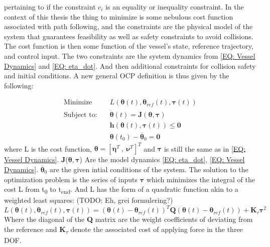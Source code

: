 pertaining to if the constraint $c_i$ is an equality or inequality constraint. In the context of this thesis the thing to minimize is some nebulous cost function
associated with path following, and the constraints are the physical model of the system that guarantees feasibility as well as safety constraints to avoid collisions.
The cost function is then some function of the vessel's state, reference trajectory, and control input. The two constraints are the system dynamics from \eqref{EQ: Vessel Dynamics}
and \eqref{EQ: eta_dot}. And then additional constraints for collision safety and initial conditions. A new general \gls{OCP} definition is thus given by the following:

\begin{subequations}
    \label{EQ :OCP description}
\begin{align}
    \textrm{Minimize} \quad & {L}(\bm{\theta}(t), \bm{\theta}_{ref}(t), \bm{\tau}(t)) \\
    \textrm{Subject to:} \quad & \dot{\bm{\theta}}(t) = \textbf{J}(\bm{\theta}, \bm{\tau}) \\
                         \quad & \textbf{h}(\bm{\theta}(t), \bm{\tau}(t)) \leq \bm{0} \\
                         \quad & \bm{\theta}(t_0) - \overline{\bm{\theta}}_0 = \bm{0}
\end{align}
\end{subequations}
where L is the cost function, $\bm{\theta} = [\bm{\eta}^T \ , \ \bm{\nu}^T]^T$ and $\bm{\tau}$ is still the same as in \eqref{EQ: Vessel Dynamics}. 
\textbf{J}($\bm{\theta}, \bm{\tau}$) Are the model dynamics \eqref{EQ: eta_dot}, \eqref{EQ: Vessel Dynamics}. $\overline{\bm{\theta}}_0$ are the
given intial conditions of the system.
The solution to the optimization problem is the series of inputs $\bm{\tau}$ which minimizes the integral of the cost L 
from t\textsubscript{0} to t\textsubscript{end}. And L has the form of a quadratic function
akin to a weighted least squares: (TODO: Eh, grei formulering?)
\begin{equation}
    L(\bm{\theta}(t), \bm{\theta}_{ref}(t), \bm{\tau}(t)) = (\bm{\theta}(t) - \bm{\theta}_{ref}(t))^T \textbf{Q} (\bm{\theta}(t) - \bm{\theta}_{ref}(t)) + \textbf{K}_\tau \bm{\tau}^2
\end{equation}
Where the diagonal of the \textbf{Q} matrix are the weight coefficients of deviating from the reference
and \textbf{K}\textsubscript{$\tau$} denote the associated cost of applying force in the three \gls{DOF}.

